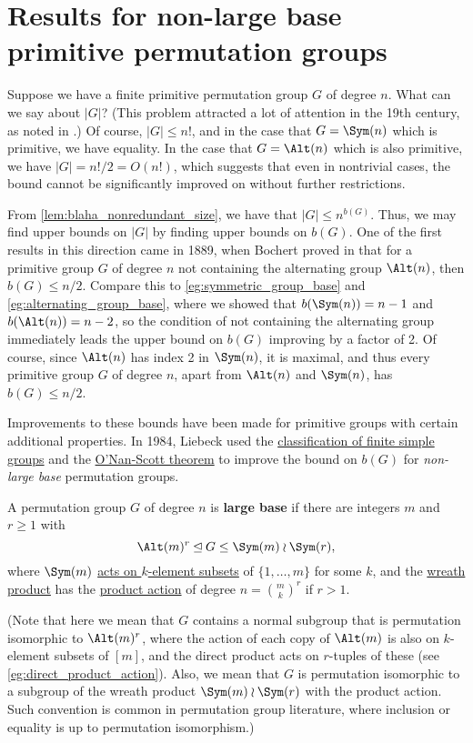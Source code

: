 \section{Results for non-large base primitive permutation groups}

Suppose we have a finite primitive permutation group $G$ of degree $n$. What can we say about $|G|$? (This problem attracted a lot of attention in the 19th century, as noted in \cite{moscatiello_roney-dougal2021}.) Of course, $|G| \leq n!$, and in the case that $G = \Sym(n)$ which is primitive, we have equality. In the case that $G = \Alt(n)$ which is also primitive, we have $|G| = n!/2 = O(n!)$, which suggests that even in nontrivial cases, the bound cannot be significantly improved on without further restrictions.

From \autoref{lem:blaha_nonredundant_size}, we have that $|G| \leq n^{b(G)}$. Thus, we may find upper bounds on $|G|$ by finding upper bounds on $b(G)$. One of the first results in this direction came in 1889, when Bochert proved in \cite{bochert1889} that for a primitive group $G$ of degree $n$ not containing the alternating group $\Alt(n)$, then $b(G) \leq n/2$. Compare this to \autoref{eg:symmetric_group_base} and \autoref{eg:alternating_group_base}, where we showed that $b(\Sym(n)) = n-1$ and $b(\Alt(n)) = n-2$, so the condition of not containing the alternating group immediately leads the upper bound on $b(G)$ improving by a factor of 2. Of course, since $\Alt(n)$ has index 2 in $\Sym(n)$, it is maximal, and thus every primitive group $G$ of degree $n$, apart from $\Alt(n)$ and $\Sym(n)$, has $b(G) \leq n/2$.

Improvements to these bounds have been made for primitive groups with certain additional properties. In 1984, Liebeck used the \hyperref[thm:cfsg]{classification of finite simple groups} and the \hyperref[thm:onan-scott]{O'Nan-Scott theorem} to improve the bound on $b(G)$ for \textit{non-large base} permutation groups.

\begin{definition}\label{def:large_base}
    A permutation group $G$ of degree $n$ is \textbf{large base} if there are integers $m$ and $r \geq 1$ with
    $$\Alt(m)^r \unlhd G \leq \Sym(m) \wr \Sym(r),$$
    where $\Sym(m)$ \hyperref[eg:product_action_Sm_subsets]{acts on $k$-element subsets} of $\{1,\dotsc,m\}$ for some $k$, and the \hyperref[def:wreath_product]{wreath product} has the \hyperref[def:product_action]{product action} of degree $n = \binom{m}{k}^r$ if $r > 1$.

    (Note that here we mean that $G$ contains a normal subgroup that is permutation isomorphic to $\Alt(m)^r$, where the action of each copy of $\Alt(m)$ is also on $k$-element subsets of $[m]$, and the direct product acts on $r$-tuples of these (see \autoref{eg:direct_product_action}). Also, we mean that $G$ is permutation isomorphic to a subgroup of the wreath product $\Sym(m) \wr \Sym(r)$ with the product action. Such convention is common in permutation group literature, where inclusion or equality is up to permutation isomorphism.)
\end{definition}

